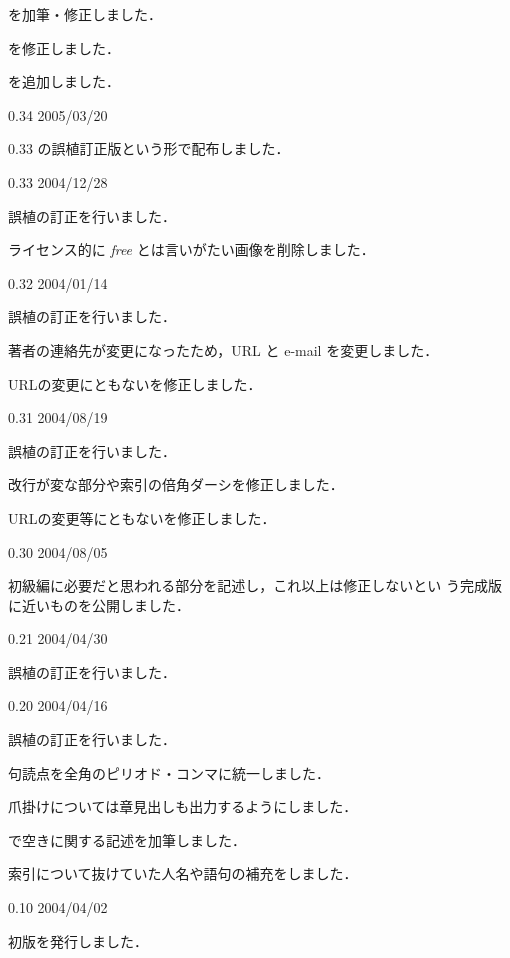 \begin{changelog}
   \item {}を加筆・修正しました．
   \item {}を修正しました．
   \item {}を追加しました．
 \item[0.34 2005/03/20] %
   \item 0.33 の誤植訂正版という形で配布しました．
 \item[0.33 2004/12/28] %
   \item 誤植の訂正を行いました．
   \item ライセンス的に \emph{free} とは言いがたい画像を削除しました．
 \item[0.32 2004/01/14] %
   \item 誤植の訂正を行いました．
   \item 著者の連絡先が変更になったため，URL と e-mail を変更しました．
   \item URLの変更にともないを修正しました．
 \item[0.31 2004/08/19] %
   \item 誤植の訂正を行いました．
   \item 改行が変な部分や索引の倍角ダーシを修正しました．
   \item URLの変更等にともないを修正しました．
 \item[0.30 2004/08/05] %
   \item 初級編に必要だと思われる部分を記述し，これ以上は修正しないとい
   う完成版に近いものを公開しました．
 \item[0.21 2004/04/30] %
   \item 誤植の訂正を行いました．
 \item[0.20 2004/04/16] %
   \item 誤植の訂正を行いました．
   \item 句読点を全角のピリオド・コンマに統一しました．
   \item 爪掛けについては章見出しも出力するようにしました．
   \item {}で空きに関する記述を加筆しました．
   \item 索引について抜けていた人名や語句の補充をしました．
 \item[0.10 2004/04/02] 
   \item 初版を発行しました．
\end{changelog}

